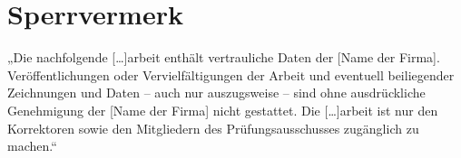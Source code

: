 \section*{Sperrvermerk}

„Die nachfolgende […]arbeit enthält vertrauliche Daten der [Name der Firma]. Veröffentlichungen oder Vervielfältigungen der Arbeit und eventuell beiliegender Zeichnungen und Daten – auch nur auszugsweise – sind ohne ausdrückliche Genehmigung der [Name der Firma] nicht gestattet. Die […]arbeit ist nur den Korrektoren sowie den Mitgliedern des Prüfungsausschusses zugänglich zu machen.“